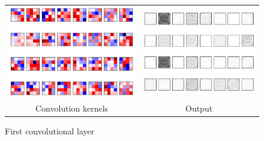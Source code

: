 \documentclass[a4paper, 11pt, table]{article}
\begin{document}
\begin{figure}[H]
\begin{tabular}{cc}
	\includegraphics[scale=0.4]{conv_layers/filters1.png} & \includegraphics[scale=0.4]{conv_layers/conv1.png} \\
	Convolution kernels & Output \\[6pt]

\end{tabular}
\caption{First convolutional layer}
\end{figure}
\end{document}
